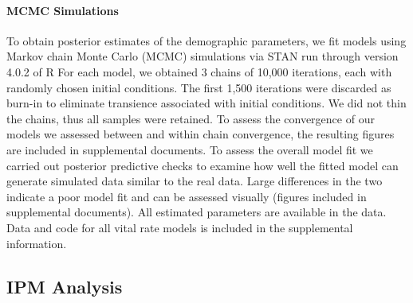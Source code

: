 \documentclass[11pt]{article}
\begin{document}
\paragraph{MCMC Simulations}
To obtain posterior estimates of the demographic parameters, we fit models using Markov chain Monte Carlo (MCMC) simulations via STAN run through version 4.0.2 of R \cite{Rcite,Rstancite} 
For each model, we obtained 3 chains of 10,000 iterations, each with randomly chosen initial conditions. 
The first 1,500 iterations were discarded as burn-in to eliminate transience associated with initial conditions. 
We did not thin the chains, thus all samples were retained. 
To assess the convergence of our models we assessed between and within chain convergence, the resulting figures are included in supplemental documents. 
To assess the overall model fit we carried out posterior predictive checks to examine how well the fitted model can generate simulated data similar to the real data.
Large differences in the two indicate a poor model fit and can be assessed visually (figures included in supplemental documents). 
All estimated parameters are available in the data. 
Data and code for all vital rate models is included in the supplemental information.

\subsection*{IPM Analysis}
\end{document}
